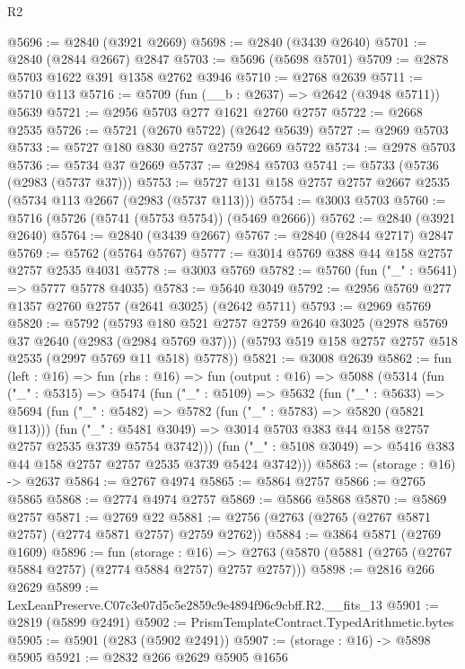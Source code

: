 \begin{lexlean}{R2}
\begin{coremodule}
@5696 := @2840 (@3921 @2669)
@5698 := @2840 (@3439 @2640)
@5701 := @2840 (@2844 @2667) @2847
@5703 := @5696 (@5698 @5701)
@5709 := @2878 @5703 @1622 @391 @1358 @2762 @3946
@5710 := @2768 @2639
@5711 := @5710 @113
@5716 := @5709 (fun (__b : @2637) => @2642 (@3948 @5711)) @5639
@5721 := @2956 @5703 @277 @1621 @2760 @2757
@5722 := @2668 @2535
@5726 := @5721 (@2670 @5722) (@2642 @5639)
@5727 := @2969 @5703
@5733 := @5727 @180 @830 @2757 @2759 @2669 @5722
@5734 := @2978 @5703
@5736 := @5734 @37 @2669
@5737 := @2984 @5703
@5741 := @5733 (@5736 (@2983 (@5737 @37)))
@5753 := @5727 @131 @158 @2757 @2757 @2667 @2535 (@5734 @113 @2667 (@2983 (@5737 @113)))
@5754 := @3003 @5703
@5760 := @5716 (@5726 (@5741 (@5753 @5754)) (@5469 @2666))
@5762 := @2840 (@3921 @2640)
@5764 := @2840 (@3439 @2667)
@5767 := @2840 (@2844 @2717) @2847
@5769 := @5762 (@5764 @5767)
@5777 := @3014 @5769 @388 @44 @158 @2757 @2757 @2535 @4031
@5778 := @3003 @5769
@5782 := @5760 (fun ("_" : @5641) => @5777 @5778 @4035)
@5783 := @5640 @3049
@5792 := @2956 @5769 @277 @1357 @2760 @2757 (@2641 @3025) (@2642 @5711)
@5793 := @2969 @5769
@5820 := @5792
    (@5793
      @180
      @521
      @2757
      @2759
      @2640
      @3025
      (@2978 @5769 @37 @2640 (@2983 (@2984 @5769 @37)))
      (@5793 @519 @158 @2757 @2757 @518 @2535 (@2997 @5769 @11 @518) @5778))
@5821 := @3008 @2639
@5862 := fun (left : @16) =>
  fun (rhs : @16) =>
  fun (output : @16) =>
  @5088
    (@5314
      (fun ("_" : @5315) =>
      @5474
        (fun ("_" : @5109) =>
        @5632
          (fun ("_" : @5633) =>
          @5694
            (fun ("_" : @5482) => @5782 (fun ("_" : @5783) => @5820 (@5821 @113)))
            (fun ("_" : @5481 @3049) =>
            @3014 @5703 @383 @44 @158 @2757 @2757 @2535 @3739 @5754 @3742)))
        (fun ("_" : @5108 @3049) => @5416 @383 @44 @158 @2757 @2757 @2535 @3739 @5424 @3742)))
@5863 := (storage : @16) -> @2637
@5864 := @2767 @4974
@5865 := @5864 @2757
@5866 := @2765 @5865
@5868 := @2774 @4974 @2757
@5869 := @5866 @5868
@5870 := @5869 @2757
@5871 := @2769 @22
@5881 := @2756 (@2763 (@2765 (@2767 @5871 @2757) (@2774 @5871 @2757) @2759 @2762))
@5884 := @3864 @5871 (@2769 @1609)
@5896 := fun (storage : @16) =>
  @2763 (@5870 (@5881 (@2765 (@2767 @5884 @2757) (@2774 @5884 @2757) @2757 @2757)))
@5898 := @2816 @266 @2629
@5899 := LexLeanPreserve.C07c3e07d5c5e2859c9e4894f96c9cbff.R2.__fits_13
@5901 := @2819 (@5899 @2491)
@5902 := PrismTemplateContract.TypedArithmetic.bytes
@5905 := @5901 (@283 (@5902 @2491))
@5907 := (storage : @16) -> @5898 @5905
@5921 := @2832
    @266
    @2629
    @5905
    @1656

\end{coremodule}
\end{lexlean}
